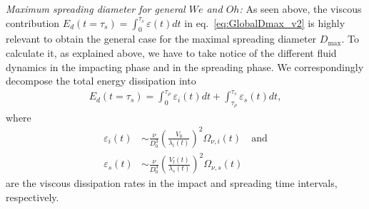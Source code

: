 \documentclass[preprint,amssymb,superscriptaddress,aps,prl,floatfix]{revtex4-1}
\begin{document}
{\it Maximum spreading diameter for general $We$ and $Oh$:} 
As seen above,  the viscous contribution $E_d(t=\tau_s)
  =\int_0^{\tau_s}   \varepsilon (t) dt  $  
in eq.~\eqref{eq:GlobalDmax_v2} is highly relevant 
to obtain the general case 
for the maximal spreading diameter $D_\text{max}$. 
To calculate it, as explained above, we have to take notice of the different
fluid dynamics in the impacting phase and in the spreading phase.
We correspondingly decompose the total energy dissipation into
\begin{align}
	\label{eq:dissipationIntegral}
	E_d(t = \tau_s) = \int_0^{\tau_\rho}\varepsilon_i(t)dt + \int_{\tau_\rho}^{\tau_s}\varepsilon_s(t)dt,
\end{align} 
where 
\begin{align}\label{eq14}
	\varepsilon_i(t) &\sim \frac{\nu}{D_0^3}\left(\frac{V_0}{\lambda_i(t)}\right)^2\Omega_{\nu,i}(t)\quad\text{and}\\
 \label{eq15}
	\varepsilon_s(t) &\sim \frac{\nu}{D_0^3}\left(\frac{V_\text{f}(t)}{\lambda_s(t)}\right)^2\Omega_{\nu,s}(t)
\end{align}
 are the viscous dissipation rates in the impact and spreading time intervals, respectively. 
 
\end{document}
